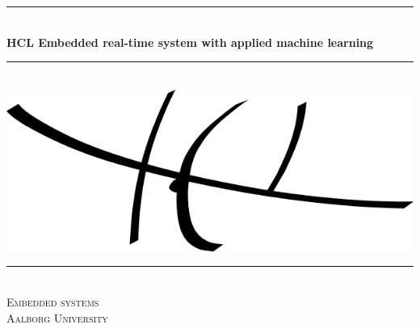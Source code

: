 \begin{titlingpage}

  \centering
  \rule{\linewidth}{0.2 mm} \\[0.5 cm]
  { \huge \bfseries HCL Embedded real-time system with applied machine learning}\\
  \rule{\linewidth}{0.2 mm} \\[2 cm]
  \includegraphics[scale=0.70]{images/hclLogo.png}\\[2 cm]
  \rule{\linewidth}{0.2 mm} \\[0.3 cm]
  \textsc{\LARGE Embedded systems} \\[0.5 cm]
  \textsc{\large Aalborg University}\\[0.5 cm]
  {\Large \groupnumber}\\[0.5 cm]

\end{titlingpage}
